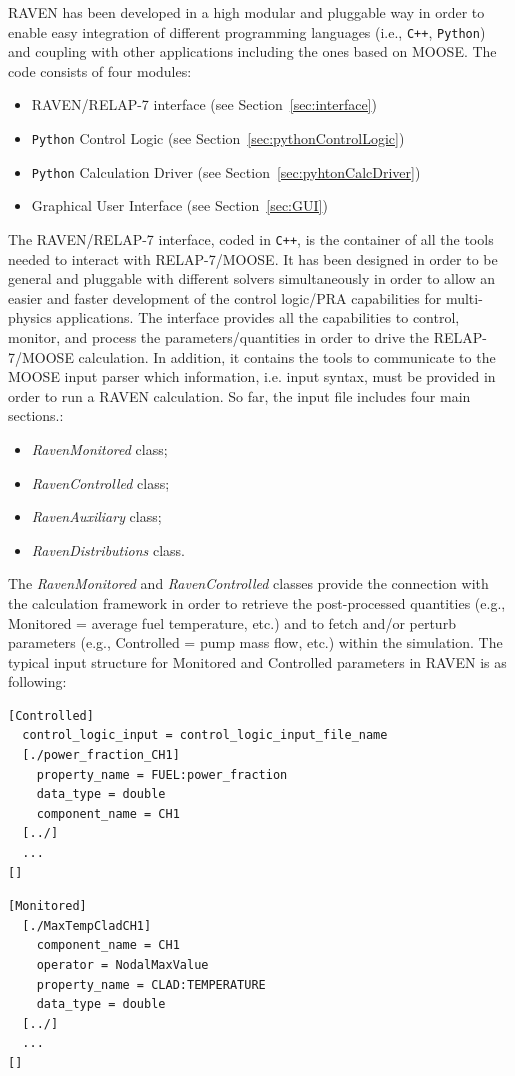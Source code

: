 \documentclass{mc2013}
\begin{document}
RAVEN has been developed in a high modular and pluggable way in order to enable easy integration of different programming languages (i.e., \verb!C++!, \verb!Python!) and coupling with other applications including the ones based on MOOSE. The code consists of four modules:
\begin{itemize}
\item RAVEN/RELAP-7 interface (see Section~\ref{sec:interface})
\item \verb!Python! Control Logic (see Section~\ref{sec:pythonControlLogic})
\item \verb!Python! Calculation Driver (see Section~\ref{sec:pyhtonCalcDriver})
\item Graphical User Interface (see Section~\ref{sec:GUI})
\end{itemize}

\label{sec:interface}
The RAVEN/RELAP-7 interface, coded in \verb!C++!, is the container of all the tools needed to interact with RELAP-7/MOOSE. It has been designed in order to be general and pluggable with different solvers simultaneously in order to allow an easier and faster development of the control logic/PRA capabilities for multi-physics applications.
The interface provides all the capabilities to control, monitor, and process the parameters/quantities in order to drive the RELAP-7/MOOSE calculation. In addition, it contains the tools to communicate to the MOOSE input parser which information, i.e. input syntax, must be provided in order to run a RAVEN  calculation. So far, the input file includes four main sections.:
\begin{itemize}
\item \emph{RavenMonitored} class;
\item \emph{RavenControlled} class;
\item \emph{RavenAuxiliary} class;
\item \emph{RavenDistributions} class.
\end{itemize}
The \emph{RavenMonitored} and \emph{RavenControlled}  classes provide the connection with the calculation framework in order to retrieve the post-processed quantities (e.g., Monitored = average fuel temperature, etc.) and to fetch and/or perturb parameters (e.g., Controlled = pump mass flow, etc.) within the simulation. The typical input structure for Monitored and Controlled parameters in RAVEN is as following:
\begin{lstlisting}
[Controlled]
  control_logic_input = control_logic_input_file_name
  [./power_fraction_CH1]
    property_name = FUEL:power_fraction
    data_type = double
    component_name = CH1
  [../]
  ...
[]
\end{lstlisting}
\begin{lstlisting}
[Monitored]
  [./MaxTempCladCH1]
    component_name = CH1
    operator = NodalMaxValue
    property_name = CLAD:TEMPERATURE
    data_type = double
  [../]
  ...
[]
\end{lstlisting}
\end{document}

